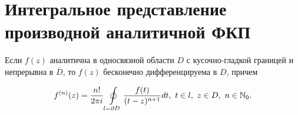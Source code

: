 \documentclass[../../main.tex]{subfiles}
\begin{document}
\section{Интегральное представление производной аналитичной ФКП}
	
\begin{thm}
	Если $f(z)$ аналитична в односвязной области $D$ 
	с кусочно-гладкой границей и непрерывна в $\overline D$, то 
	$f(z)$ бесконечно дифференцируема в $D$, причем 
	
	\begin{equation}
	\label{lec33:7}
	f^{(n)}(z) = \frac{n!}{2\pi i} \oint\limits_{l = \partial D}
	\frac{f(t)}{(t-z)^{n+1}} dt,\
	t \in l,\ z \in D,\ n \in \mathbb{N}_0.
	\end{equation}
	
\end{thm}
\end{document}
